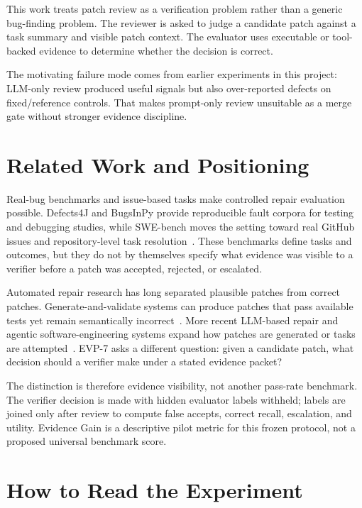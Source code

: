 \documentclass[conference]{IEEEtran}
\begin{document}
This work treats patch review as a verification problem rather than a generic
bug-finding problem. The reviewer is asked to judge a candidate patch against a
task summary and visible patch context. The evaluator uses executable or
tool-backed evidence to determine whether the decision is correct.

The motivating failure mode comes from earlier experiments in this project:
LLM-only review produced useful signals but also over-reported defects on
fixed/reference controls. That makes prompt-only review unsuitable as a merge
gate without stronger evidence discipline.

\section{Related Work and Positioning}

Real-bug benchmarks and issue-based tasks make controlled repair evaluation
possible. Defects4J and BugsInPy provide reproducible fault corpora for testing
and debugging studies, while SWE-bench moves the setting toward real GitHub
issues and repository-level task resolution~\cite{just2014defects4j,widyasari2020bugsinpy,jimenez2024swebench}.
These benchmarks define tasks and outcomes, but they do not by themselves
specify what evidence was visible to a verifier before a patch was accepted,
rejected, or escalated.

Automated repair research has long separated plausible patches from correct
patches. Generate-and-validate systems can produce patches that pass available
tests yet remain semantically incorrect~\cite{qi2015patchcorrectness}. More
recent LLM-based repair and agentic software-engineering systems expand how
patches are generated or tasks are attempted~\cite{xia2023llmapr,yang2024sweagent}.
EVP-7 asks a different question: given a candidate patch, what decision should
a verifier make under a stated evidence packet?

The distinction is therefore evidence visibility, not another pass-rate
benchmark. The verifier decision is made with hidden evaluator labels withheld;
labels are joined only after review to compute false accepts, correct recall,
escalation, and utility. Evidence Gain is a descriptive pilot metric for this
frozen protocol, not a proposed universal benchmark score.

\section{How to Read the Experiment}
\end{document}
